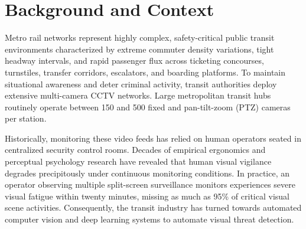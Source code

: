 \documentclass[12pt,a4paper]{report}
\begin{document}
\section{Background and Context}
Metro rail networks represent highly complex, safety-critical public transit environments characterized by extreme commuter density variations, tight headway intervals, and rapid passenger flux across ticketing concourses, turnstiles, transfer corridors, escalators, and boarding platforms. To maintain situational awareness and deter criminal activity, transit authorities deploy extensive multi-camera CCTV networks. Large metropolitan transit hubs routinely operate between 150 and 500 fixed and pan-tilt-zoom (PTZ) cameras per station.

Historically, monitoring these video feeds has relied on human operators seated in centralized security control rooms. Decades of empirical ergonomics and perceptual psychology research have revealed that human visual vigilance degrades precipitously under continuous monitoring conditions. In practice, an operator observing multiple split-screen surveillance monitors experiences severe visual fatigue within twenty minutes, missing as much as 95\% of critical visual scene activities. Consequently, the transit industry has turned towards automated computer vision and deep learning systems to automate visual threat detection.
\end{document}
